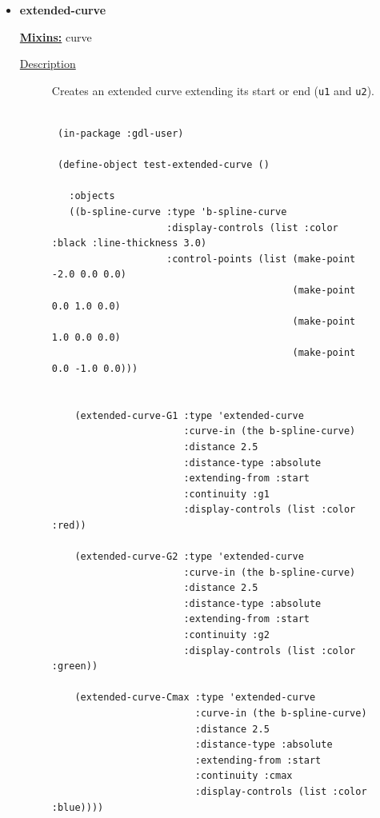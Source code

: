 \documentclass [11pt]{book}
\begin{document}
\begin{itemize}
\item {}
\label{prim:extended-curve}
\textbf{extended-curve}


\textbf{
\underline{Mixins:}} curve





\begin{description}

\item [
\underline{Description}]


Creates an extended curve extending its start or end  (\texttt{u1} and \texttt{u2}).



\end{description}




\begin{figure}
\begin{lrbox}{\boxedverb}
\begin{minipage}{\linewidth}
{\small

\begin{verbatim}
  
 (in-package :gdl-user)

 (define-object test-extended-curve ()

   :objects
   ((b-spline-curve :type 'b-spline-curve
                    :display-controls (list :color :black :line-thickness 3.0)
                    :control-points (list (make-point -2.0 0.0 0.0)
                                          (make-point  0.0 1.0 0.0) 
                                          (make-point  1.0 0.0 0.0) 
                                          (make-point  0.0 -1.0 0.0))) 
                                           
    
    (extended-curve-G1 :type 'extended-curve
                       :curve-in (the b-spline-curve)
                       :distance 2.5
                       :distance-type :absolute
                       :extending-from :start
                       :continuity :g1
                       :display-controls (list :color :red))
    
    (extended-curve-G2 :type 'extended-curve
                       :curve-in (the b-spline-curve)
                       :distance 2.5
                       :distance-type :absolute
                       :extending-from :start
                       :continuity :g2
                       :display-controls (list :color :green))
    
    (extended-curve-Cmax :type 'extended-curve
                         :curve-in (the b-spline-curve)
                         :distance 2.5
                         :distance-type :absolute
                         :extending-from :start
                         :continuity :cmax
                         :display-controls (list :color :blue))))


\end{verbatim}}
\end{minipage}
\end{lrbox}
\end{figure}
\end{itemize}
\end{document}
